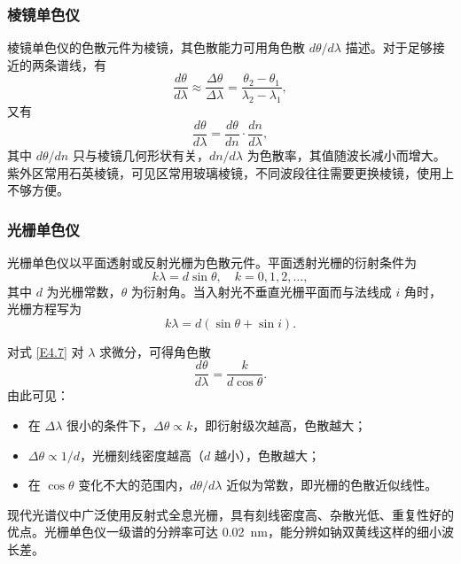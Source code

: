 \documentclass[a4paper,8pt,twocolumn]{article}
\begin{document}
\subsubsection{棱镜单色仪}

棱镜单色仪的色散元件为棱镜，其色散能力可用角色散 $d\theta/d\lambda$ 描述。对于足够接近的两条谱线，有
\begin{equation}
  \frac{d\theta}{d\lambda}
  \approx \frac{\Delta\theta}{\Delta\lambda}
  = \frac{\theta_2-\theta_1}{\lambda_2-\lambda_1} ,
  \tag{E4.4}
\end{equation}
又有
\begin{equation}
  \frac{d\theta}{d\lambda}
  = \frac{d\theta}{dn} \cdot \frac{dn}{d\lambda},
  \tag{E4.5}
\end{equation}
其中 $d\theta/dn$ 只与棱镜几何形状有关，$dn/d\lambda$ 为色散率，其值随波长减小而增大。紫外区常用石英棱镜，可见区常用玻璃棱镜，不同波段往往需要更换棱镜，使用上不够方便。

\subsubsection{光栅单色仪}

光栅单色仪以平面透射或反射光栅为色散元件。平面透射光栅的衍射条件为
\begin{equation}
  k\lambda = d\sin\theta,
  \quad k=0,1,2,\dots,
  \tag{E4.6}
\end{equation}
其中 $d$ 为光栅常数，$\theta$ 为衍射角。当入射光不垂直光栅平面而与法线成 $i$ 角时，光栅方程写为
\begin{equation}
  k\lambda = d(\sin\theta + \sin i).
  \tag{E4.7}
\end{equation}

对式 \eqref{E4.7} 对 $\lambda$ 求微分，可得角色散
\begin{equation}
  \frac{d\theta}{d\lambda}
  = \frac{k}{d\cos\theta}.
  \tag{E4.8}
\end{equation}
由此可见：
\begin{itemize}
  \item 在 $\Delta\lambda$ 很小的条件下，$\Delta\theta \propto k$，即衍射级次越高，色散越大；
  \item $\Delta\theta \propto 1/d$，光栅刻线密度越高（$d$ 越小），色散越大；
  \item 在 $\cos\theta$ 变化不大的范围内，$d\theta/d\lambda$ 近似为常数，即光栅的色散近似线性。
\end{itemize}

现代光谱仪中广泛使用反射式全息光栅，具有刻线密度高、杂散光低、重复性好的优点。光栅单色仪一级谱的分辨率可达 \SI{0.02}{\nano\meter}，能分辨如钠双黄线这样的细小波长差。
\end{document}
